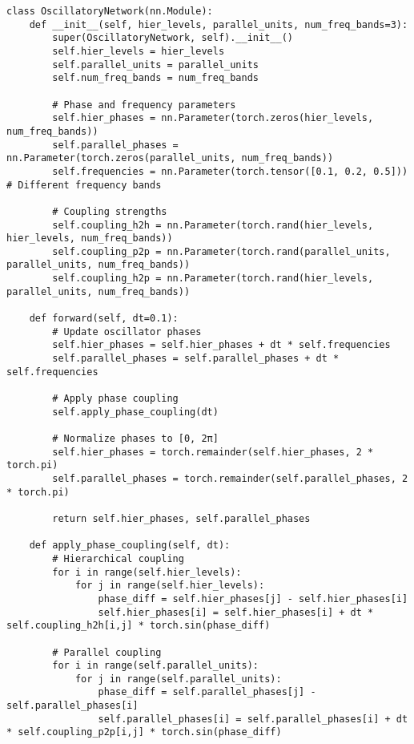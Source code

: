 \documentclass[11pt,a4paper,twocolumn]{article}
\begin{document}
\begin{lstlisting}[caption={Oscillatory Network PyTorch Implementation}, label={lst:oscillatory-network-pytorch}]
class OscillatoryNetwork(nn.Module):
    def __init__(self, hier_levels, parallel_units, num_freq_bands=3):
        super(OscillatoryNetwork, self).__init__()
        self.hier_levels = hier_levels
        self.parallel_units = parallel_units
        self.num_freq_bands = num_freq_bands

        # Phase and frequency parameters
        self.hier_phases = nn.Parameter(torch.zeros(hier_levels, num_freq_bands))
        self.parallel_phases = nn.Parameter(torch.zeros(parallel_units, num_freq_bands))
        self.frequencies = nn.Parameter(torch.tensor([0.1, 0.2, 0.5]))  # Different frequency bands

        # Coupling strengths
        self.coupling_h2h = nn.Parameter(torch.rand(hier_levels, hier_levels, num_freq_bands))
        self.coupling_p2p = nn.Parameter(torch.rand(parallel_units, parallel_units, num_freq_bands))
        self.coupling_h2p = nn.Parameter(torch.rand(hier_levels, parallel_units, num_freq_bands))

    def forward(self, dt=0.1):
        # Update oscillator phases
        self.hier_phases = self.hier_phases + dt * self.frequencies
        self.parallel_phases = self.parallel_phases + dt * self.frequencies

        # Apply phase coupling
        self.apply_phase_coupling(dt)

        # Normalize phases to [0, 2π]
        self.hier_phases = torch.remainder(self.hier_phases, 2 * torch.pi)
        self.parallel_phases = torch.remainder(self.parallel_phases, 2 * torch.pi)

        return self.hier_phases, self.parallel_phases

    def apply_phase_coupling(self, dt):
        # Hierarchical coupling
        for i in range(self.hier_levels):
            for j in range(self.hier_levels):
                phase_diff = self.hier_phases[j] - self.hier_phases[i]
                self.hier_phases[i] = self.hier_phases[i] + dt * self.coupling_h2h[i,j] * torch.sin(phase_diff)

        # Parallel coupling
        for i in range(self.parallel_units):
            for j in range(self.parallel_units):
                phase_diff = self.parallel_phases[j] - self.parallel_phases[i]
                self.parallel_phases[i] = self.parallel_phases[i] + dt * self.coupling_p2p[i,j] * torch.sin(phase_diff)


\end{lstlisting}
\end{document}
